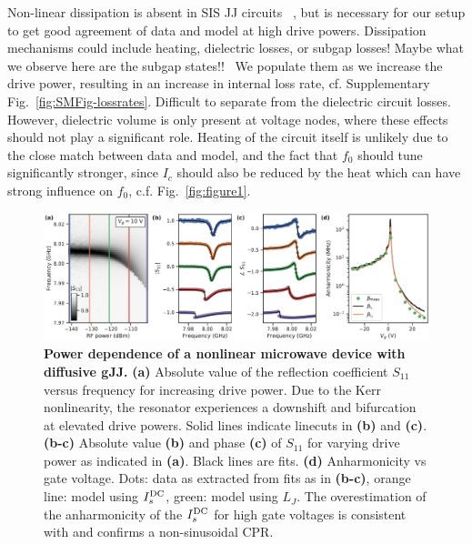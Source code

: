 Non-linear dissipation is absent in SIS JJ circuits ~\cite{boakninDispersiveMicrowaveBifurcation2007}, but is necessary for our setup to get good agreement of data and model at high drive powers.
%
Dissipation mechanisms could include heating, dielectric losses, or subgap losses!
%
Maybe what we observe here are the subgap states!!~\cite{fuechsleEffectMicrowavesCurrentPhase2009,dassonnevilleDissipationSupercurrentFluctuations2013}
%
We populate them as we increase the drive power, resulting in an increase in internal loss rate, cf. Supplementary Fig.~\ref{fig:SMFig-lossrates}.
%
Difficult to separate from the dielectric circuit losses.
%
However, dielectric volume is only present at voltage nodes, where these effects should not play a significant role.
%
Heating of the circuit itself is unlikely due to the close match between data and model, and the fact that $f_0$ should tune significantly stronger, since $I_c$ should also be reduced by the heat which can have strong influence on $f_0$, c.f. Fig.~\ref{fig:figure1}.

\begin{figure}
	\centering
	\includegraphics[width=\linewidth]{chapter-gJJ-CPR/figs/Figure4}
	\caption{
		\textbf{Power dependence of a nonlinear microwave device with diffusive gJJ.}
		\textbf{(a)} Absolute value of the reflection coefficient $S_{11}$ versus frequency for increasing drive power.
		Due to the Kerr nonlinearity, the resonator experiences a downshift and bifurcation at elevated drive powers.
		Solid lines indicate linecuts in \textbf{(b)} and \textbf{(c)}.
		\textbf{(b-c)} Absolute value \textbf{(b)} and phase \textbf{(c)} of $S_{11}$ for varying drive power as indicated in \textbf{(a)}.
		Black lines are fits.
		\textbf{(d)} Anharmonicity vs gate voltage.
		Dots: data as extracted from fits as in \textbf{(b-c)}, orange line: model using $I_s^{\rm DC}$, green: model using $L_J$.
		The overestimation of the anharmonicity of the $I_s^{\rm DC}$ for high gate voltages is consistent with and confirms a non-sinusoidal CPR.
	}
	\label{fig:figure4}
\end{figure}

